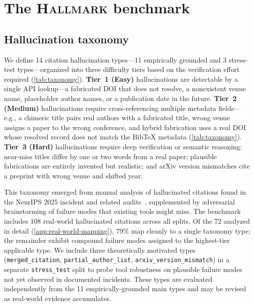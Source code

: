 \section{The \textsc{Hallmark} benchmark}
\label{sec:benchmark}

\subsection{Hallucination taxonomy}
\label{sec:taxonomy}

We define 14 citation hallucination types---11 empirically grounded and 3 stress-test types---organized into three difficulty tiers based on the verification effort required (\cref{tab:taxonomy}).
\textbf{Tier~1 (Easy)} hallucinations are detectable by a single API lookup---a fabricated DOI that does not resolve, a nonexistent venue name, placeholder author names, or a publication date in the future.
\textbf{Tier~2 (Medium)} hallucinations require cross-referencing multiple metadata fields---e.g., a chimeric title pairs real authors with a fabricated title, wrong venue assigns a paper to the wrong conference, and hybrid fabrication uses a real DOI whose resolved record does not match the BibTeX metadata (\cref{tab:taxonomy}).
\textbf{Tier~3 (Hard)} hallucinations require deep verification or semantic reasoning: near-miss titles differ by one or two words from a real paper; plausible fabrications are entirely invented but realistic; and arXiv version mismatches cite a preprint with wrong venue and shifted year.

This taxonomy emerged from manual analysis of hallucinated citations found in the NeurIPS 2025 incident and related audits~\citep{ghostcite2026,hallucitation2026}, supplemented by adversarial brainstorming of failure modes that existing tools might miss.
The benchmark includes 108 real-world hallucinated citations across all splits.
Of the 72 analyzed in detail (\cref{app:real-world-mapping}), 79\% map cleanly to a single taxonomy type; the remainder exhibit compound failure modes assigned to the highest-tier applicable type.
We include three theoretically motivated types (\texttt{merged\_citation}, \texttt{partial\_author\_list}, \texttt{arxiv\_version\_mismatch}) in a separate \texttt{stress\_test} split to probe tool robustness on plausible failure modes not yet observed in documented incidents.
These types are evaluated independently from the 11 empirically-grounded main types and may be revised as real-world evidence accumulates.

